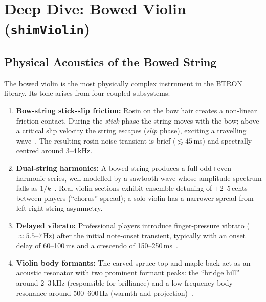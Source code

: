 \documentclass[10pt,journal,compsoc,twocolumn]{article}
\begin{document}
\section{Deep Dive: Bowed Violin (\texttt{shimViolin})}
\label{sec:violin}

\subsection{Physical Acoustics of the Bowed String}

The bowed violin is the most physically complex instrument in the BTRON
library.  Its tone arises from four coupled subsystems:

\begin{enumerate}[leftmargin=*]
    \item \textbf{Bow-string stick-slip friction:}  Rosin on the bow hair
    creates a non-linear friction contact.  During the \emph{stick} phase the
    string moves with the bow; above a critical slip velocity the string
    escapes (\emph{slip} phase), exciting a travelling
    wave~\cite{serafin2004bowed}.  The resulting rosin noise transient is
    brief ($\lesssim 45$\,ms) and spectrally centred around 3--4\,kHz.

    \item \textbf{Dual-string harmonics:}  A bowed string produces a full
    odd+even harmonic series, well modelled by a sawtooth wave whose amplitude
    spectrum falls as $1/k$~\cite{fletcher1998physics}.  Real violin sections
    exhibit ensemble detuning of $\pm 2$--$5$\,cents between players
    (``chorus'' spread); a solo violin has a narrower spread from left-right
    string asymmetry.

    \item \textbf{Delayed vibrato:}  Professional players introduce
    finger-pressure vibrato ($\approx 5.5$--$7$\,Hz) after the initial
    note-onset transient, typically with an onset delay of 60--100\,ms and a
    crescendo of 150--250\,ms~\cite{serafin2004bowed}.

    \item \textbf{Violin body formants:}  The carved spruce top and maple
    back act as an acoustic resonator with two prominent formant peaks:
    the ``bridge hill'' around 2--3\,kHz (responsible for brilliance) and
    a low-frequency body resonance around 500--600\,Hz (warmth and
    projection)~\cite{fletcher1998physics}.
\end{enumerate}
\end{document}
